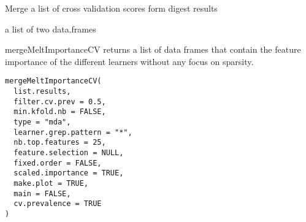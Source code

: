 \documentclass[a4paper]{book}
\begin{document}
%
\begin{Details}
Merge a list of cross validation scores form digest results
\end{Details}
%
\begin{Value}
a list of two data.frames
\end{Value}
%
\begin{Description}
mergeMeltImportanceCV returns a list of data frames that contain the feature importance of the different learners without any focus on sparsity.
\end{Description}
%
\begin{Usage}
\begin{verbatim}
mergeMeltImportanceCV(
  list.results,
  filter.cv.prev = 0.5,
  min.kfold.nb = FALSE,
  type = "mda",
  learner.grep.pattern = "*",
  nb.top.features = 25,
  feature.selection = NULL,
  fixed.order = FALSE,
  scaled.importance = TRUE,
  make.plot = TRUE,
  main = FALSE,
  cv.prevalence = TRUE
)
\end{verbatim}
\end{Usage}
%
\end{document}

